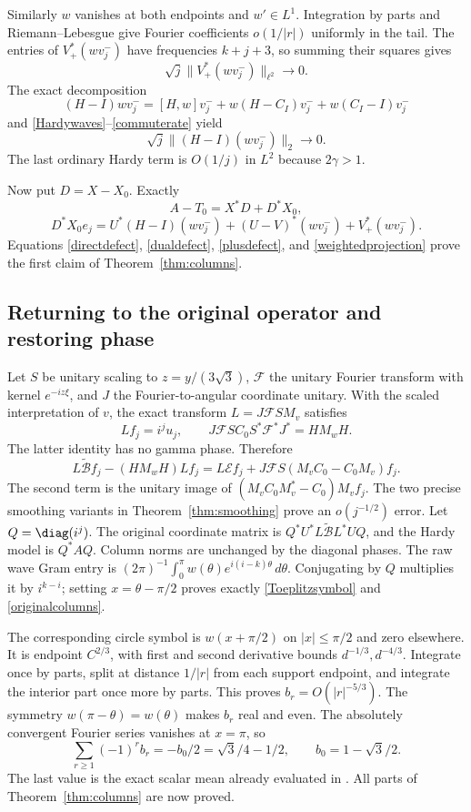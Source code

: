 Similarly $w$ vanishes at both endpoints and $w'\in L^1$.
Integration by parts and Riemann--Lebesgue give Fourier coefficients
$o(1/|r|)$ uniformly in the tail. The entries of $V_+^*(wv_j^-)$
have frequencies $k+j+3$, so summing their squares gives
\begin{equation}\label{plusdefect}
 \sqrt j\|V_+^*(wv_j^-)\|_{\ell^2}\to0.
\end{equation}
The exact decomposition
\[
 (H-I)wv_j^-=[H,w]v_j^-+w(H-C_I)v_j^-+w(C_I-I)v_j^-
\]
and \eqref{Hardywaves}--\eqref{commuterate} yield
\begin{equation}\label{weightedprojection}
 \sqrt j\|(H-I)(wv_j^-)\|_2\to0.
\end{equation}
The last ordinary Hardy term is $O(1/j)$ in $L^2$ because $2\gamma>1$.

Now put $D=X-X_0$. Exactly
\[
 A-T_0=X^*D+D^*X_0,
\]
\[
 D^*X_0e_j=U^*(H-I)(wv_j^-)
       +(U-V)^*(wv_j^-)+V_+^*(wv_j^-).
\]
Equations \eqref{directdefect}, \eqref{dualdefect},
\eqref{plusdefect}, and \eqref{weightedprojection} prove the first
claim of Theorem~\ref{thm:columns}.

\subsection{Returning to the original operator and restoring phase}
Let $S$ be unitary scaling to $z=y/(3\sqrt3)$, $\mathcal F$ the
unitary Fourier transform with kernel $e^{-iz\xi}$, and $J$ the
Fourier-to-angular coordinate unitary. With the scaled interpretation
of $v$, the exact transform $L=J\mathcal FS M_v$ satisfies
\[
 Lf_j=i^ju_j,\qquad
 J\mathcal FS C_0S^*\mathcal F^*J^*=HM_wH.
\]
The latter identity has no gamma phase. Therefore
\[
 L\widetilde{\mathcal B}f_j-(HM_wH)Lf_j
   =L\mathcal Ef_j+J\mathcal FS(M_vC_0-C_0M_v)f_j.
\]
The second term is the unitary image of
$(M_vC_0M_v^*-C_0)M_vf_j$. The two precise smoothing variants
in Theorem~\ref{thm:smoothing} prove an $o(j^{-1/2})$ error.
Let $Q=\diag(i^j)$. The original coordinate matrix is
$Q^*U^*L\widetilde{\mathcal B}L^*UQ$, and the Hardy model is
$Q^*AQ$. Column norms are unchanged by the diagonal phases.
The raw wave Gram entry is
$(2\pi)^{-1}\int_0^\pi w(\theta)e^{i(i-k)\theta}\,d\theta$.
Conjugating by $Q$ multiplies it by $i^{k-i}$; setting
$x=\theta-\pi/2$ proves exactly \eqref{Toeplitzsymbol} and
\eqref{originalcolumns}.

The corresponding circle symbol is $w(x+\pi/2)$ on
$|x|\le\pi/2$ and zero elsewhere. It is endpoint $C^{2/3}$,
with first and second derivative bounds $d^{-1/3},d^{-4/3}$.
Integrate once by parts, split at distance $1/|r|$ from each
support endpoint, and integrate the interior part once more by
parts. This proves $b_r=O(|r|^{-5/3})$.
The symmetry $w(\pi-\theta)=w(\theta)$ makes $b_r$ real and even.
The absolutely convergent Fourier series vanishes at $x=\pi$, so
\begin{equation}\label{alternatingsum}
 \sum_{r\ge1}(-1)^rb_r=-b_0/2=\sqrt3/4-1/2,
 \qquad b_0=1-\sqrt3/2.
\end{equation}
The last value is the exact scalar mean already evaluated in
\cite[Section 9]{r124}. All parts of Theorem~\ref{thm:columns}
are now proved.
